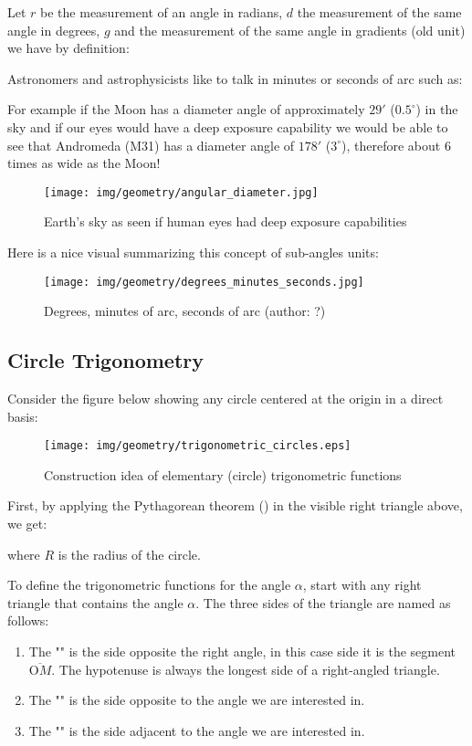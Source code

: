 	Let $r$ be the measurement of an angle in radians, $d$ the measurement of the same angle in degrees, $g$ and the measurement of the same angle in gradients (old unit) we have by definition:
	
	Astronomers and astrophysicists like to talk in minutes or seconds of arc such as:
	
	For example if the Moon has a diameter angle of approximately $29'$ ($0.5^\circ$) in the sky and if our eyes would have a deep exposure capability we would be able to see that Andromeda (M31) has a diameter angle of $178'$ ($3^\circ$), therefore about $6$ times as wide as the Moon!
	\begin{figure}[H]
		\centering
		\texttt{[image: img/geometry/angular\_diameter.jpg]}
		\caption[]{Earth's sky as seen if human eyes had deep exposure capabilities}
	\end{figure}
	Here is a  nice visual summarizing this concept of sub-angles units:
	\begin{figure}[H]
		\centering
		\texttt{[image: img/geometry/degrees\_minutes\_seconds.jpg]}
		\caption[Degrees, minutes of arc, seconds of arc]{Degrees, minutes of arc, seconds of arc (author: ?)}
	\end{figure}

	\pagebreak
	\subsection{Circle Trigonometry}\label{circle trigonometry}
	Consider the figure below showing any circle centered at the origin in a direct basis:		
	\begin{figure}[H]
		\centering
		\texttt{[image: img/geometry/trigonometric\_circles.eps]}
		\caption{Construction idea of elementary (circle) trigonometric functions}
	\end{figure}

	First, by applying the Pythagorean theorem () in the visible right triangle above, we get:
	
where $R$ is the radius of the circle.

	To define the trigonometric functions for the angle $\alpha$, start with any right triangle that contains the angle $\alpha$. The three sides of the triangle are named as follows:
	\begin{enumerate}
		\item The "" is the side opposite the right angle, in this case side it is the segment $\overline{\text{O}M}$. The hypotenuse is always the longest side of a right-angled triangle.
		
		\item The "" is the side opposite to the angle we are interested in.
		
		\item The "" is the side adjacent to the angle we are interested in.
	\end{enumerate}

